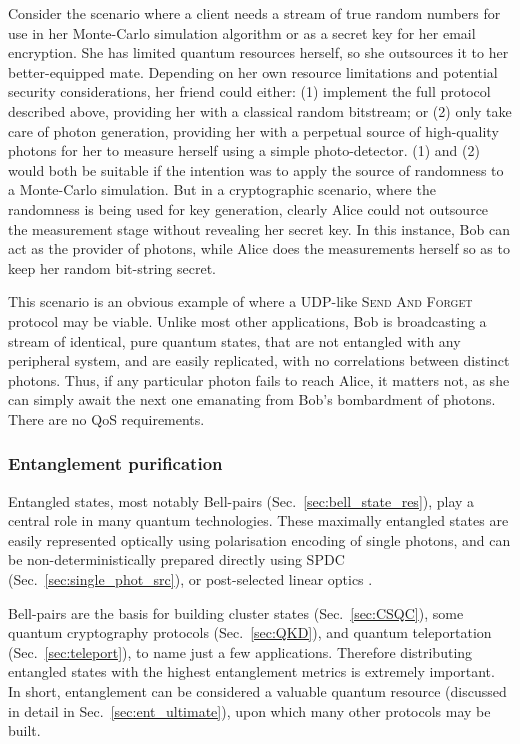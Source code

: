 \documentclass[aps, rmp, twocolumn, amsmath, amssymb, nofootinbib, superscriptaddress, longbibliography, floatfix, table-of-contents, eqsecnum]{revtex4-1}
\begin{document}
Consider the scenario where a client needs a stream of true random numbers for use in her Monte-Carlo simulation algorithm or as a secret key for her email encryption. She has limited quantum resources herself, so she outsources it to her better-equipped mate. Depending on her own resource limitations and potential security considerations, her friend could either: (1) implement the full protocol described above, providing her with a classical random bitstream; or (2) only take care of photon generation, providing her with a perpetual source of high-quality photons for her to measure herself using a simple photo-detector. (1) and (2) would both be suitable if the intention was to apply the source of randomness to a Monte-Carlo simulation. But in a cryptographic scenario, where the randomness is being used for key generation, clearly Alice could not outsource the measurement stage without revealing her secret key. In this instance, Bob can act as the provider of photons, while Alice does the measurements herself so as to keep her random bit-string secret.

This scenario is an obvious example of where a UDP-like \textsc{Send And Forget} protocol may be viable. Unlike most other applications, Bob is broadcasting a stream of identical, pure quantum states, that are not entangled with any peripheral system, and are easily replicated, with no correlations between distinct photons. Thus, if any particular photon fails to reach Alice, it matters not, as she can simply await the next one emanating from Bob's bombardment of photons. There are no QoS requirements.

%
%

\subsubsection{Entanglement purification} \label{sec:ent_purif} 

Entangled states, most notably Bell-pairs (Sec.~\ref{sec:bell_state_res}), play a central role in many quantum technologies. These maximally entangled states are easily represented optically using polarisation encoding of single photons, and can be non-deterministically prepared directly using SPDC (Sec.~\ref{sec:single_phot_src}), or post-selected linear optics \cite{???}.

Bell-pairs are the basis for building cluster states (Sec.~\ref{sec:CSQC}), some quantum cryptography protocols (Sec.~\ref{sec:QKD}), and quantum teleportation (Sec.~\ref{sec:teleport}), to name just a few applications. Therefore distributing entangled states with the highest entanglement metrics is extremely important. In short, entanglement can be considered a valuable quantum resource (discussed in detail in Sec.~\ref{sec:ent_ultimate}), upon which many other protocols may be built.
\end{document}
